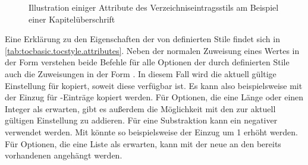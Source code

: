 \begin{description}
\begin{figure}
{%
    }
    \caption{Illustration einiger Attribute des Verzeichniseintragsstils
       am Beispiel einer Kapitelüberschrift}
    \label{fig:tocbasic.undottedtocline}
  \end{figure}
\end{description}
Eine Erklärung zu den Eigenschaften der von  definierten
Stile findet sich in \autoref{tab:tocbasic.tocstyle.attributes}.
Neben der normalen Zuweisung eines Wertes
in der Form  verstehen beide Befehle
für alle Optionen der durch \KOMAScript{} definierten Stile auch die
Zuweisungen in der Form . In
diesem Fall wird die aktuell gültige Einstellung für 
kopiert, soweit diese verfügbar ist. Es kann also beispielsweise mit
 der Einzug für -Einträge kopiert
werden. Für Optionen, die eine Länge oder einen Integer als 
erwarten, gibt es außerdem die Möglichkeit mit
 den  zur aktuell gültigen
Einstellung zu addieren. Für eine Substraktion kann ein negativer 
verwendet werden. Mit  könnte so beispielsweise der
Einzug um 1 erhöht werden. Für Optionen, die eine
Liste als  erwarten, kann mit
 der neue  an den bereits
vorhandenen angehängt werden.

